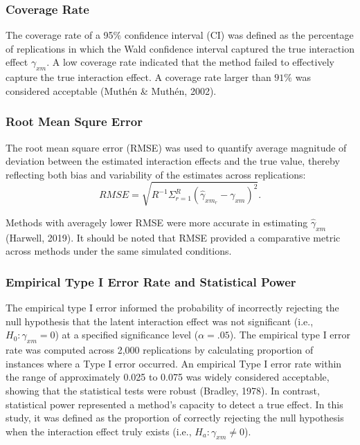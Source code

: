 \documentclass[
  man,mask]{apa6}
\begin{document}
\subsubsection{Coverage Rate}\label{coverage-rate}

The coverage rate of a 95\(\%\) confidence interval (CI) was defined as the percentage of replications in which the Wald confidence interval captured the true interaction effect \(\gamma_{xm}\). A low coverage rate indicated that the method failed to effectively capture the true interaction effect. A coverage rate larger than \(91\%\) was considered acceptable (Muthén \& Muthén, 2002).

\subsubsection{Root Mean Squre Error}\label{root-mean-squre-error}

The root mean square error (RMSE) was used to quantify average magnitude of deviation between the estimated interaction effects and the true value, thereby reflecting both bias and variability of the estimates across replications:
\begin{equation}
RMSE = \sqrt{R^{-1}\Sigma^{R}_{r = 1}(\hat{\gamma}_{xm_{r}} - \gamma_{xm})^2}.
\end{equation}

Methods with averagely lower RMSE were more accurate in estimating \(\hat{\gamma}_{xm}\) (Harwell, 2019). It should be noted that RMSE provided a comparative metric across methods under the same simulated conditions.

\subsubsection{Empirical Type I Error Rate and Statistical Power}\label{empirical-type-i-error-rate-and-statistical-power}

The empirical type I error informed the probability of incorrectly rejecting the null hypothesis that the latent interaction effect was not significant (i.e., \(H_{0}: \gamma_{xm} = 0\)) at a specified significance level (\(\alpha = .05\)). The empirical type I error rate was computed across 2,000 replications by calculating proportion of instances where a Type I error occurred. An empirical Type I error rate within the range of approximately 0.025 to 0.075 was widely considered acceptable, showing that the statistical tests were robust (Bradley, 1978). In contrast, statistical power represented a method's capacity to detect a true effect. In this study, it was defined as the proportion of correctly rejecting the null hypothesis when the interaction effect truly exists (i.e., \(H_{a}: \gamma_{xm} \neq 0\)).
\end{document}
